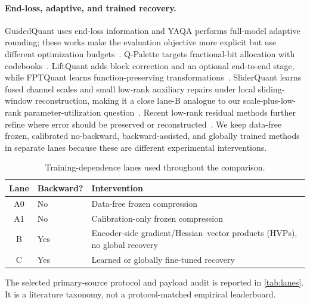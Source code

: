 \paragraph{End-loss, adaptive, and trained recovery.}
GuidedQuant uses end-loss information and YAQA performs full-model adaptive
rounding; these works make
the evaluation objective more explicit but use different optimization
budgets~\citep{kim2025guidedquant,tseng2026yaqa}.
Q-Palette targets fractional-bit allocation with codebooks~\citep{lee2025qpalette}.
LiftQuant adds block correction and an optional end-to-end stage, while
FPTQuant learns function-preserving transformations~\citep{he2026liftquant,vanbreugel2026fptquant}.
SliderQuant learns fused channel scales and small low-rank auxiliary repairs
under local sliding-window reconstruction, making it a close lane-B analogue
to our scale-plus-low-rank parameter-utilization question~\citep{wang2026sliderquant}.
Recent low-rank residual methods further refine where error should be
preserved or reconstructed~\citep{cho2026srr,park2026serq,li2026rescomp}.
We keep data-free frozen, calibrated no-backward, backward-assisted, and
globally trained methods in separate lanes because these are different
experimental interventions.

\begin{table}[t]
  \caption{Training-dependence lanes used throughout the comparison.}
  \label{tab:lane-summary}
  \centering
  \small
  \begin{tabular}{@{}clp{4.2cm}@{}}
    \toprule
    Lane & Backward? & Intervention \\
    \midrule
    A0 & No & Data-free frozen compression \\
    A1 & No & Calibration-only frozen compression \\
    B  & Yes & Encoder-side gradient/Hessian--vector products (HVPs), no global recovery \\
    C  & Yes & Learned or globally fine-tuned recovery \\
    \bottomrule
  \end{tabular}
\end{table}

The selected primary-source protocol and payload audit is reported in
\cref{tab:lanes}.  It is a literature taxonomy, not a protocol-matched
empirical leaderboard.
